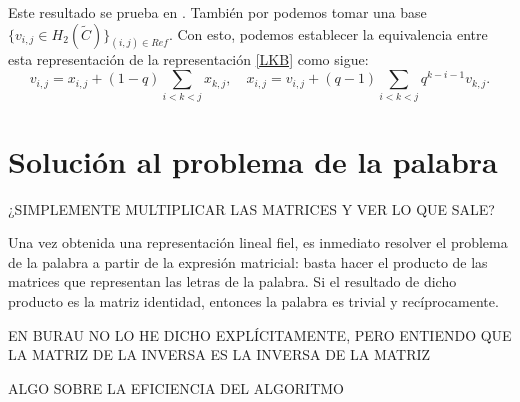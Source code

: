 \documentclass[TFG.tex]{subfiles}
\begin{document}
Este resultado se prueba en \cite{Bil}. También por \cite{Bil} podemos tomar una base $\{v_{i,j}\in H_2(\tilde{C})\}_{(i,j)\in Ref}$. Con esto, podemos establecer la equivalencia \cite{nundam} entre esta representación de la representación  \ref{LKB} como sigue:
\[
v_{i,j}=x_{i,j}+(1-q)\sum_{i<k<j}x_{k,j},\quad x_{i,j}=v_{i,j}+(q-1)\sum_{i<k<j}q^{k-i-1}v_{k,j}.
\]


\section{Solución al problema de la palabra}
¿SIMPLEMENTE MULTIPLICAR LAS MATRICES Y VER LO QUE SALE?

Una vez obtenida una representación lineal fiel, es inmediato resolver el problema de la palabra a partir de la expresión matricial: basta hacer el producto de las matrices que representan las letras de la palabra. Si el resultado de dicho producto es la matriz identidad, entonces la palabra es trivial y recíprocamente.

EN BURAU NO LO HE DICHO EXPLÍCITAMENTE, PERO ENTIENDO QUE LA MATRIZ DE LA INVERSA ES LA INVERSA DE LA MATRIZ

ALGO SOBRE LA EFICIENCIA DEL ALGORITMO
\end{document}
